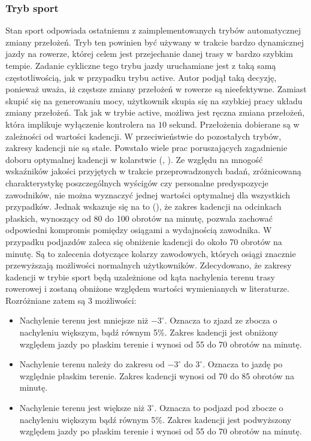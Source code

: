 \subsubsection{Tryb sport}  
Stan sport odpowiada ostatniemu z zaimplementowanych trybów automatycznej zmiany przełożeń. Tryb ten powinien być używany w trakcie bardzo dynamicznej jazdy na rowerze, której celem jest przejechanie danej trasy w bardzo szybkim tempie. Zadanie cykliczne tego trybu jazdy uruchamiane jest z taką samą częstotliwością, jak w przypadku trybu active. Autor podjął taką decyzję, ponieważ uważa, iż częstsze zmiany przełożeń w rowerze są nieefektywne. Zamiast skupić się na generowaniu mocy, użytkownik skupia się na szybkiej pracy układu zmiany przełożeń. Tak jak w trybie active, możliwa jest ręczna zmiana przełożeń, która implikuje wyłączenie kontrolera na $10$ sekund. Przełożenia dobierane są w zależności od wartości kadencji. W przeciwieństwie do pozostałych trybów, zakresy kadencji nie są stałe. Powstało wiele prac poruszających zagadnienie doboru optymalnej kadencji w kolarstwie (\cite{cuttingEdge}, \cite{optCadence}). Ze względu na mnogość wskaźników jakości przyjętych w trakcie przeprowadzonych badań, zróżnicowaną charakterystykę poszczególnych wyścigów czy personalne predyspozycje zawodników, nie można wyznaczyć jednej wartości optymalnej dla wszystkich przypadków. Jednak wskazuje się na to (\cite{cuttingEdge}), że zakres kadencji na odcinkach płaskich, wynoszący od 80 do 100 obrotów na minutę, pozwala zachować odpowiedni kompromis pomiędzy osiągami a wydajnością zawodnika. W przypadku podjazdów zaleca się obniżenie kadencji do około 70 obrotów na minutę. Są to zalecenia dotyczące kolarzy zawodowych, których osiągi znacznie przewyższają możliwości normalnych użytkowników. Zdecydowano, że zakresy kadencji w trybie sport będą uzależnione od kąta nachylenia terenu trasy rowerowej i zostaną obniżone względem wartości wymienianych w literaturze. Rozróżniane zatem są 3 możliwości:
\begin{itemize}
\item
Nachylenie terenu jest mniejsze niż $-3^{\circ}$. Oznacza to zjazd ze zbocza o nachyleniu większym, bądź równym 5\%. Zakres kadencji jest obniżony względem jazdy po płaskim terenie i wynosi od 55 do 70 obrotów na minutę.
\item
    Nachylenie terenu należy do zakresu od $-3^{\circ}$ do $3^{\circ}$. Oznacza to jazdę po względnie płaskim terenie. Zakres kadencji wynosi od 70 do 85 obrotów na minutę.
\item
Nachylenie terenu jest większe niż $3^{\circ}$. Oznacza to podjazd pod zbocze o nachyleniu większym bądź równym 5\%. Zakres kadencji jest podwyższony względem jazdy po płaskim terenie i wynosi od 55 do 70 obrotów na minutę.

\end{itemize}
